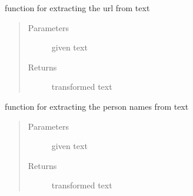 \documentclass[letterpaper,10pt,english]{sphinxmanual}
\begin{document}
\begin{fulllineitems}
\label{\detokenize{index:data_preprocessing.data_preprocessing.extract_urls}}
\sphinxAtStartPar
function for extracting the url from text
\begin{quote}\begin{description}
\item[{Parameters}] \leavevmode
\sphinxAtStartPar
{} \textendash{} given text

\item[{Returns}] \leavevmode
\sphinxAtStartPar
transformed text

\end{description}\end{quote}

\end{fulllineitems}


\begin{fulllineitems}
\label{\detokenize{index:data_preprocessing.data_preprocessing.find_persons}}
\sphinxAtStartPar
function for extracting the person names from text
\begin{quote}\begin{description}
\item[{Parameters}] \leavevmode
\sphinxAtStartPar
{} \textendash{} given text

\item[{Returns}] \leavevmode
\sphinxAtStartPar
transformed text

\end{description}\end{quote}

\end{fulllineitems}

\end{document}
